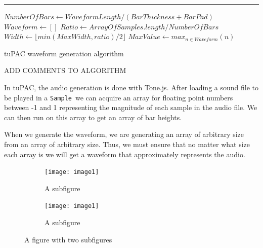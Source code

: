 \documentclass[12pt,a4paper,twoside,openright]{report}
\newcommand{\sample}{\texttt{Sample}}
\begin{document}
\begin{algorithm}[H]
\DontPrintSemicolon
{}
\vspace{1mm} \hrule \vspace{1mm}
\nl $NumberOfBars \gets WaveformLength/(BarThickness + BarPad)$\;
\nl $Waveform \gets []$\;
\nl $Ratio \gets ArrayOfSamples.length / NumberOfBars$\;
\nl $Width \gets \lfloor min(MaxWidth, ratio)/2\rfloor$\;
\nl {}
\nl $MaxValue \gets max_{n\in Waveform}(n)$\;
\nl {}
\caption{tuPAC waveform generation algorithm}\label{alg:waveform}
\end{algorithm}

ADD COMMENTS TO ALGORITHM

In tuPAC, the audio generation is done with Tone.js. After loading a sound file to be played in a \sample\ we can acquire an array for floating point numbers between -1 and 1 representing the magnitude of each sample in the audio file. We can then run  on this array to get an array of bar heights.

When we generate the waveform, we are generating an array of arbitrary size from an array of arbitrary size. Thus, we must ensure that no matter what size each array is we will get a waveform that approximately represents the audio.

\begin{figure}
\centering
\begin{subfigure}{.5\textwidth}
  \centering
  \texttt{[image: image1]}
  \caption{A subfigure}
  \label{fig:sub1}
\end{subfigure}%
\begin{subfigure}{.5\textwidth}
  \centering
  \texttt{[image: image1]}
  \caption{A subfigure}
  \label{fig:sub2}
\end{subfigure}
\caption{A figure with two subfigures}
\label{fig:test}
\end{figure}
\end{document}
